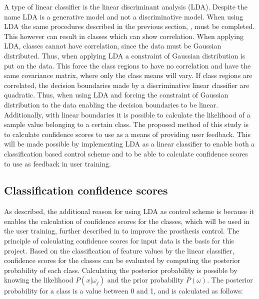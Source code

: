 A type of linear classifier is the linear discriminant analysis (LDA). Despite the name LDA is a generative model and not a discriminative model. \cite{Duda2000} 
When using LDA the same procedures described in the previous section, , must be completed. This however can result in classes which can show correlation. When applying LDA, classes cannot have correlation, since the data must be Gaussian distributed. Thus, when applying LDA a constraint of Gaussian distribution is put on the data. This force the class regions to have no correlation and have the same covariance matrix, where only the class means will vary.
If class regions are correlated, the decision boundaries made by a discriminative linear classifier are quadratic. Thus, when using LDA and forcing the constraint of Gaussian distribution to the data enabling the decision boundaries to be linear. Additionally, with linear boundaries it is possible to calculate the likelihood of a sample value belonging to a certain class. \cite{Fisher1936, Duda2000}
The proposed method of this study is to calculate confidence scores to use as a means of providing user feedback. This will be made possible by implementing LDA as a linear classifier to enable both a classification based control scheme and to be able to calculate confidence scores to use as feedback in user training. 


\subsection{Classification confidence scores} \label{sub:BG:classificationConfidenceScores}
As described, the additional reason for using LDA as control scheme is because it enables the calculation of confidence scores for the classes, which will be used in the user training, further described in  to improve the prosthesis control. The principle of calculating confidence scores for input data is the basis for this project. 
Based on the classification of feature values by the linear classifier, confidence scores for the classes can be evaluated by computing the posterior probability of each class. Calculating the posterior probability is possible by knowing the likelihood $P(x|\omega_j)$ and the prior probability $P(\omega)$.
The posterior probability for a class is a value between 0 and 1, and is calculated as follows:


